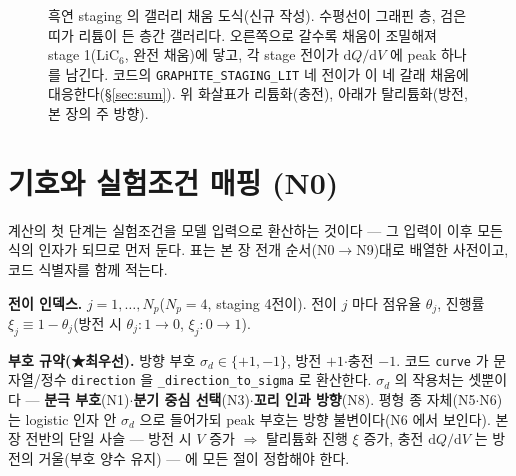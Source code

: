 \documentclass[11pt,a4paper]{article}
\newcommand{\dd}{\mathrm{d}}
\newcommand{\sgn}{\sigma_d}
\begin{document}
\begin{figure}[t]
\centering
{}
\caption{흑연 staging 의 갤러리 채움 도식(신규 작성). 수평선이 그래핀 층, 검은 띠가 리튬이 든 층간 갤러리다. 오른쪽으로 갈수록 채움이 조밀해져 stage 1($\mathrm{LiC_6}$, 완전 채움)에 닿고, 각 stage 전이가 $\dd Q/\dd V$ 에 peak 하나를 남긴다. 코드의 \texttt{GRAPHITE\_STAGING\_LIT} 네 전이가 이 네 갈래 채움에 대응한다(\S\ref{sec:sum}). 위 화살표가 리튬화(충전), 아래가 탈리튬화(방전, 본 장의 주 방향).}
\label{fig:staging}
\end{figure}

\tableofcontents
\newpage

\section{기호와 실험조건 매핑 (N0)}\label{sec:setup}
계산의 첫 단계는 실험조건을 모델 입력으로 환산하는 것이다 — 그 입력이 이후 모든 식의 인자가 되므로 먼저 둔다. 표는 본 장 전개 순서(N0$\to$N9)대로 배열한 사전이고, 코드 식별자를 함께 적는다.

\textbf{전이 인덱스.} $j=1,\dots,N_p$($N_p=4$, staging 4전이). 전이 $j$ 마다 점유율 $\theta_j$, 진행률 $\xi_j\equiv1-\theta_j$(방전 시 $\theta_j:1\to0$, $\xi_j:0\to1$).

\textbf{부호 규약(★최우선).} 방향 부호 $\sgn\in\{+1,-1\}$, 방전 $+1$$\cdot$충전 $-1$. 코드 \texttt{curve} 가 문자열/정수 \texttt{direction} 을 \texttt{\_direction\_to\_sigma} 로 환산한다. $\sgn$ 의 작용처는 셋뿐이다 — \textbf{분극 부호}(N1)$\cdot$\textbf{분기 중심 선택}(N3)$\cdot$\textbf{꼬리 인과 방향}(N8). 평형 종 자체(N5$\cdot$N6)는 logistic 인자 안 $\sgn$ 으로 들어가되 peak 부호는 방향 불변이다(N6 에서 보인다). 본 장 전반의 단일 사슬 — 방전 시 $V$ 증가 $\Rightarrow$ 탈리튬화 진행 $\xi$ 증가, 충전 $\dd Q/\dd V$ 는 방전의 거울(부호 양수 유지) — 에 모든 절이 정합해야 한다.
\end{document}
